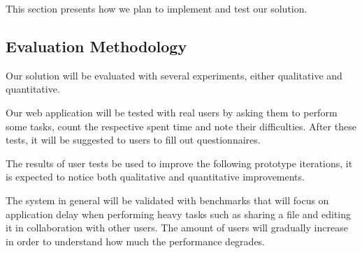 This section presents how we plan to implement and test our solution.

\subsection{Evaluation Methodology} %
	Our solution will be evaluated with several experiments, either qualitative and quantitative. 

Our web application will be tested with real users by asking them to perform some tasks, count the respective spent time and note their difficulties. After these tests, it will be suggested to users to fill out questionnaires. 

The results of user tests be used to improve the following prototype iterations, it is expected to notice both qualitative and quantitative improvements.


 
The system in general will be validated with benchmarks that will focus on application delay when performing heavy tasks such as sharing a file and editing it in collaboration with other users. The amount of users will gradually increase in order to understand how much the performance degrades. 
